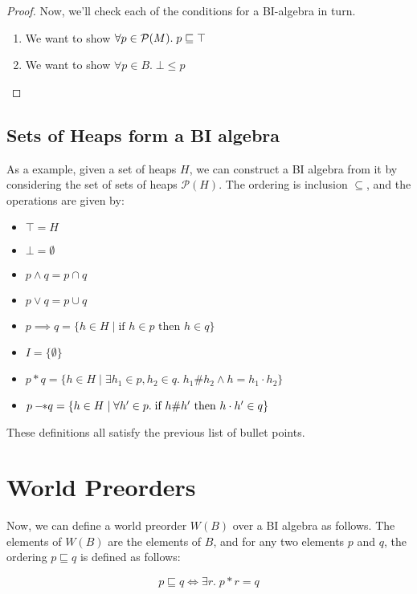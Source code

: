\begin{proof}
Now, we'll check each of the conditions for a BI-algebra in turn. 

\begin{enumerate}
\item  We want to show $\forall p \in \mathcal{P}(M).\; p \sqsubseteq \top$


\item We want to show $\forall p \in B.\; \bot \leq p$
\end{enumerate}
\end{proof}

\subsection{Sets of Heaps form a BI algebra}


As a example, given a set of heaps $H$, we can construct a BI algebra
from it by considering the set of sets of heaps $\mathcal{P}(H)$. The
ordering is inclusion $\subseteq$, and the operations are given by:

\begin{itemize}
\item $\top = H$
\item $\bot = \emptyset$
\item $p \land q = p \cap q$
\item $p \vee q = p \cup q$
\item $p \implies q = \{h \in H \;|\; \mbox{if } h \in p \mbox{ then } h \in q\}$
\item $I = \{\emptyset\}$
\item $p * q = \{ h \in H \;|\; \exists h_1 \in p, h_2 \in q.\; h_1 \# h_2 \land h = h_1 \cdot h_2\}$
\item $p -\!\!* q = \{ h \in H \;|\; \forall h' \in p.\; \mbox{if } h \# h' \mbox{ then } h \cdot h' \in q \}$
\end{itemize}

These definitions all satisfy the previous list of bullet points.

\section{World Preorders}

Now, we can define a world preorder $W(B)$ over a BI algebra as
follows.  The elements of $W(B)$ are the elements of $B$, and for
any two elements $p$ and $q$, the ordering $p \sqsubseteq q$ is 
defined as follows:

\begin{displaymath}
p \sqsubseteq q \iff \exists r.\; p * r = q
\end{displaymath}


